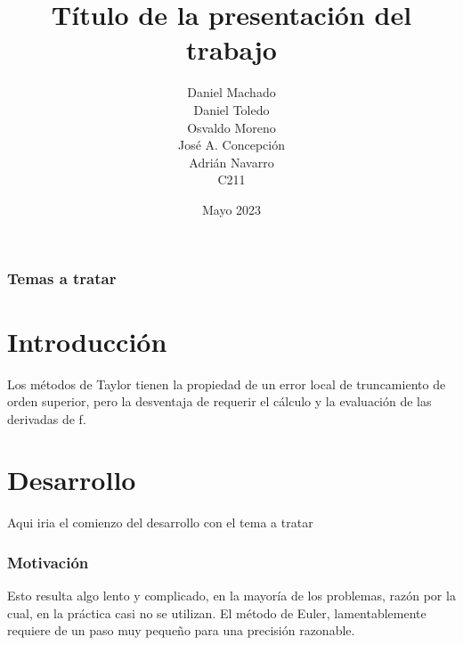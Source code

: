 \documentclass{beamer}
\title[T\'itulo del trabajo]{T\'itulo de la presentaci\'on del trabajo}
\author[Machado, Toledo, Moreno, Concepci\'on, Navarro]
		{
			Daniel Machado \\
			Daniel Toledo \\
			Osvaldo Moreno \\
			Jos\'e A. Concepci\'on \\
			Adri\'an Navarro \\
			{\small C211}
		}
\date{Mayo 2023}
\begin{document}

\begin{frame}
	\frametitle{Temas a tratar} 
	\tableofcontents 
\end{frame}

\section{Introducci\'on}
\begin{frame}
\begin{minipage}{10cm}
	Los m\'etodos de Taylor tienen la propiedad de un error local de truncamiento de orden superior, pero la desventaja de requerir el c\'alculo y la evaluaci\'on de las derivadas de f.
\end{minipage}
\end{frame}

\section{Desarrollo}
\begin{frame}
\begin{minipage}{10cm}
	Aqui iria el comienzo del desarrollo con el tema a tratar
\end{minipage}
\end{frame}

\begin{frame}
\frametitle{Motivaci\'on}
\begin{minipage}{10cm}
Esto resulta algo lento y complicado, en la mayor\'ia de los problemas, raz\'on por la cual, en la pr\'actica casi no se utilizan. El m\'etodo de Euler, lamentablemente requiere de un paso muy pequeño para una precisi\'on razonable. 
\end{minipage}
\end{frame}	
\end{document}
